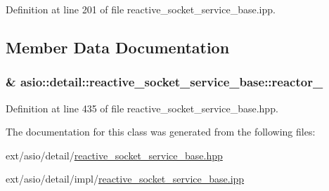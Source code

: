 Definition at line 201 of file reactive\+\_\+socket\+\_\+service\+\_\+base.\+ipp.



\subsection{Member Data Documentation}
\hypertarget{classasio_1_1detail_1_1reactive__socket__service__base_a487bbc9ae7bffc0df3c2eb0cf9d09f60}{}
\subsubsection[{reactor\+\_\+}]{\& asio\+::detail\+::reactive\+\_\+socket\+\_\+service\+\_\+base\+::reactor\+\_\+\hspace{0.3cm}{\ttfamily [protected]}}\label{classasio_1_1detail_1_1reactive__socket__service__base_a487bbc9ae7bffc0df3c2eb0cf9d09f60}


Definition at line 435 of file reactive\+\_\+socket\+\_\+service\+\_\+base.\+hpp.



The documentation for this class was generated from the following files\+:\begin{DoxyCompactItemize}
\item 
ext/asio/detail/\hyperlink{reactive__socket__service__base_8hpp}{reactive\+\_\+socket\+\_\+service\+\_\+base.\+hpp}\item 
ext/asio/detail/impl/\hyperlink{reactive__socket__service__base_8ipp}{reactive\+\_\+socket\+\_\+service\+\_\+base.\+ipp}\end{DoxyCompactItemize}

